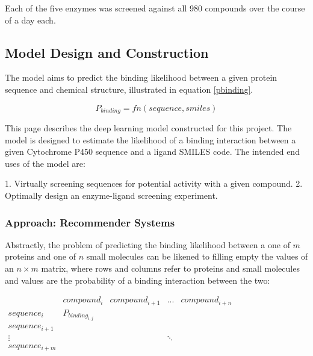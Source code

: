 \documentclass[16pt]{book}
\begin{document}
Each of the five enzymes was screened against all 980 compounds over the course of a day each.




\subsection{Model Design and Construction}

The model aims to predict the binding likelihood between a given protein sequence and chemical structure, illustrated in equation \ref{pbinding}.


\label{pbinding}
\begin{equation}
P_{binding} = fn(sequence, smiles)
\end{equation}


This page describes the deep learning model constructed for this project.
The model is designed to estimate the likelihood of a binding interaction between a given Cytochrome P450 sequence and a ligand SMILES code.
The intended end uses of the model are:

1. Virtually screening sequences for potential activity with a given compound.
2. Optimally design an enzyme-ligand screening experiment.


\subsubsection{Approach: Recommender Systems}

Abstractly, the problem of predicting the binding likelihood between a one of $m$ proteins and one of $n$ small molecules can be likened to filling empty the values of an $n \times m$ matrix, where rows and columns refer to proteins and small molecules and values are the probability of a binding interaction between the two:

\begin{center}
$
\begin{matrix} 
	 & compound_i & compound_{i+1} & ... & compound_{i+n} \\
	sequence_i  & P_{binding_{i,j}} &  &  & \\  
	sequence_{i+1} &  &  &  &  \\
	 \vdots &  &  & \ddots &  \\
	sequence_{i+m} &  &  &  &   \\
\end{matrix}
$
\end{center}
\end{document}
